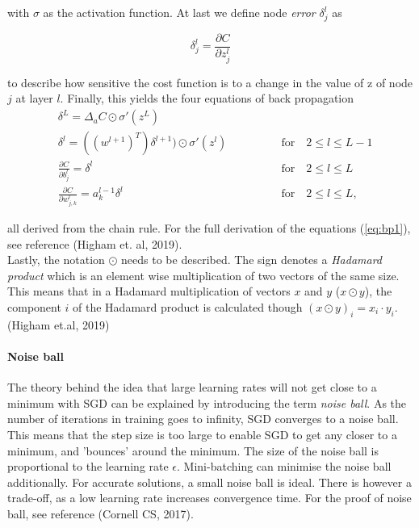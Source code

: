 \documentclass{article}
\begin{document}
\noindent with $\sigma$ as the activation function. At last we define node \textit{error} $\delta^l_j$ as

\begin{equation}
    \delta^l_j = \frac{\partial C}{\partial z^l_j}
\end{equation}

\noindent to describe how sensitive the cost function is to a change in the value of z of node $j$ at layer $l$. Finally, this yields the four equations of back propagation
\begin{equation}\label{eq:bp1}
\begin{aligned}
    &\delta^L = \Delta_a C \odot \sigma'(z^L)\\[1ex]
    &\delta^l = ((w^{l+1})^T)\delta^{l+1}) \odot \sigma'(z^l)\qquad\qquad &\textrm{for}\quad2\leq l \leq L-1\\[1ex]
    &\frac{\partial C}{\partial b_j^l} = \delta^l \qquad &\textrm{for}\quad2\leq l \leq L\\[1ex]
    &\frac{\partial C}{\partial w_{j,k}^l} = a_k^{l-1}\delta^l &\textrm{for}\quad2\leq l \leq L,
\end{aligned}
\end{equation}

\noindent all derived from the chain rule. For the full derivation of the equations (\ref{eq:bp1}), see reference (Higham et. al, 2019).\\

\noindent Lastly, the notation $\odot$ needs to be described. The sign denotes a \textit{Hadamard product} which is an element wise multiplication of two vectors of the same size. This means that in a Hadamard multiplication of vectors $x$ and $y$ ($x\odot y$), the component $i$ of the Hadamard product is calculated though $(x \odot y)_i = x_i\cdot y_i$. (Higham et.al, 2019)

\paragraph{Noise ball}\label{sec: noiseball}

\hfill \break

\noindent The theory behind the idea that large learning rates will not get close to a minimum with SGD can be explained by introducing the term \textit{noise ball}. As the number of iterations in training goes to infinity, SGD converges to a noise ball. This means that the step size is too large to enable SGD to get any closer to a minimum, and 'bounces' around the minimum. The size of the noise ball is proportional to the learning rate $\epsilon$. Mini-batching can minimise the noise ball additionally. For accurate solutions, a small noise ball is ideal. There is however a trade-off, as a low learning rate increases convergence time. For the proof of noise ball, see reference (Cornell CS, 2017).
\end{document}
